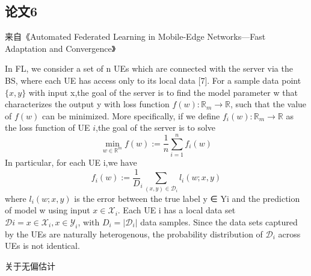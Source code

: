 \subsection{论文6}
来自《Automated Federated Learning in Mobile-Edge Networks—Fast Adaptation and Convergence》

In FL, we consider a set of n UEs which are connected with the server via the BS, where each UE has access only to its local data [7]. For a sample data point $\{x, y\}$ with input x,the goal of the server is to find the model parameter w that characterizes the output y with loss function $f(w):\mathbb{R}_m \rightarrow \mathbb{R}$, such that the value of $f(w)$ can be minimized. More specifically, if we define $f_i(w):\mathbb{R}_m \rightarrow \mathbb{R}$ as the loss function of UE $i$,the goal of the server is to solve
\begin{equation*}
    \min_{w\in\mathbb{R}^m}f(w):=\frac1n\sum_{i=1}^n f_i(w)
\end{equation*}
In particular, for each UE i,we have
\begin{equation*}
    f_i(w):=\frac1D_i\sum_{(x,y)\in\mathcal{D}_i} l_i(w;x,y)
\end{equation*}
where $l_i(w;x,y)$ is the error between the true label y ∈ Yi and the prediction of model w using input $x\in\mathcal{X}_i$. Each UE i has a local data set $\mathcal{D}i ={x\in\mathcal{X}_i, x\in\mathcal{Y}_i}$, with $D_i =|\mathcal{D}_i|$ data samples. Since the data sets captured by the UEs are naturally heterogenous, the probability distribution of $\mathcal{D}_i$ across UEs is not identical.

关于无偏估计

